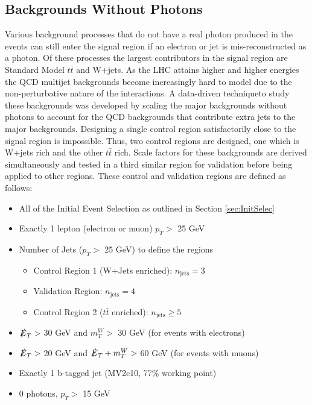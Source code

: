 \subsection{Backgrounds Without Photons}
\label{sec:BKGnoPho}
Various background processes that do not have a real photon produced in the events can still enter the signal region if an electron or jet is mis-reconstructed as a photon.  Of these processes the largest contributors in the signal region are Standard Model $t\bar{t}$ and W+jets.  As the LHC attains higher and higher energies the QCD multijet backgrounds become increasingly hard to model due to the non-perturbative nature of the interactions.  A data-driven techniqueto study these backgrounds was developed by scaling the major backgrounds without photons to account for the QCD backgrounds that contribute extra jets to the major backgrounds.  Designing a single control region satisfactorily close to the signal region is impossible.  Thus, two control regions are designed, one which is W+jets rich and the other $t\bar{t}$ rich.  Scale factors for these backgrounds are derived simultaneously and tested in a third similar region for validation before being applied to other regions.  
These control and validation regions are defined as follows:
\begin{itemize}
\item All of the Initial Event Selection as outlined in Section \ref{sec:InitSelec}
\item Exactly 1 lepton (electron or muon) $p_T >$ 25 GeV
\item Number of Jets  ($p_T >$ 25 GeV) to define the regions
	\begin{itemize}
	\item Control Region 1 (W+Jets enriched): $n_{\text{jets}} = 3$
	\item Validation Region: $n_{\text{jets}} =4$
	\item Control Region 2 ($t\bar{t}$ enriched): $n_{\text{jets}} \geq 5$
	\end{itemize}
\item $\slashed{E}_T >$ 30 GeV and $m_T^W >$ 30 GeV (for events with electrons)
\item $\slashed{E}_T >$ 20 GeV and $\slashed{E}_T + m_T^W >$ 60 GeV (for events with muons)
\item Exactly 1 b-tagged jet (MV2c10, 77\% working point)
\item 0 photons, $p_T >$ 15 GeV
\end{itemize}


